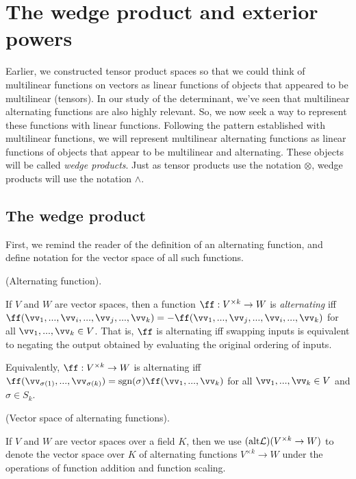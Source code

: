\chapter{The wedge product and exterior powers}

Earlier, we constructed tensor product spaces so that we could think of multilinear functions on vectors as linear functions of objects that appeared to be multilinear (tensors). In our study of the determinant, we've seen that multilinear alternating functions are also highly relevant. So, we now seek a way to represent these functions with linear functions. Following the pattern established with multilinear functions, we will represent multilinear alternating functions as linear functions of objects that appear to be multilinear and alternating. These objects will be called \textit{wedge products}. Just as tensor products use the notation $\otimes$, wedge products will use the notation $\wedge$.

\section*{The wedge product}

First, we remind the reader of the definition of an alternating function, and define notation for the vector space of all such functions.

\begin{defn}
    (Alternating function).

    If $V$ and $W$ are vector spaces, then a function $\ff:V^{\times k} \rightarrow W$ is \textit{alternating} iff \\ ${\ff(\vv_1, ..., \vv_i, ..., \vv_j, ..., \vv_k) = -\ff(\vv_1, ..., \vv_j, ..., \vv_i, ..., \vv_k)}$ for all $\vv_1, ..., \vv_k \in V$. That is, $\ff$ is alternating iff swapping inputs is equivalent to negating the output obtained by evaluating the original ordering of inputs.
    
    Equivalently, $\ff:V^{\times k} \rightarrow W$ is alternating iff
    ${\ff(\vv_{\sigma(1)}, ..., \vv_{\sigma(k)}) = \sgn(\sigma) \ff(\vv_1, ..., \vv_k)}$ for all $\vv_1, ..., \vv_k \in V$ and $\sigma \in S_k$.
\end{defn}

\begin{defn}
    (Vector space of alternating functions).
    
    If $V$ and $W$ are vector spaces over a field $K$, then we use $(\text{alt} \mathcal{L})(V^{\times k} \rightarrow W)$ to denote the vector space over $K$ of alternating functions $V^{\times k} \rightarrow W$ under the operations of function addition and function scaling.
\end{defn}

